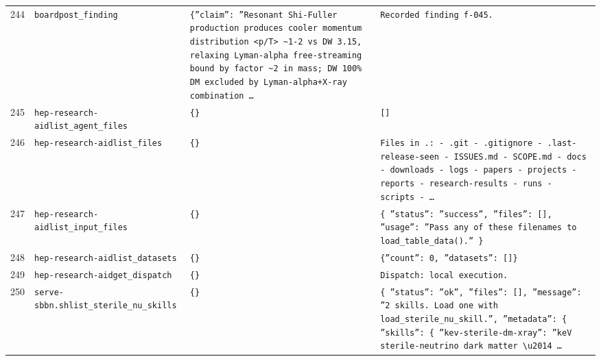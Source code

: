\documentclass[11pt,a4paper]{article}
\begin{document}
\begin{longtable}{@{}p{}p{}p{}p{}@{}}
244 & \texttt{board}\newline\texttt{post\_\allowbreak{}finding} & \texttt{\{''claim'':\allowbreak{} ''Resonant Shi-Fuller production produces cooler momentum distribution \textless{}\allowbreak{}p/\allowbreak{}T\textgreater{}\allowbreak{} \textasciitilde{}\allowbreak{}1-2 vs DW 3.15,\allowbreak{} relaxing Lyman-alpha free-streaming bound by factor \textasciitilde{}\allowbreak{}2 in mass;\allowbreak{} DW 100\% DM excluded by Lyman-alpha+X-ray combination \ldots{}\allowbreak{}} & \texttt{Recorded finding f-045.} \\
245 & \texttt{hep-research-aid}\newline\texttt{list\_\allowbreak{}agent\_\allowbreak{}files} & \texttt{\{\}\allowbreak{}} & \texttt{[]\allowbreak{}} \\
246 & \texttt{hep-research-aid}\newline\texttt{list\_\allowbreak{}files} & \texttt{\{\}\allowbreak{}} & \texttt{Files in .:\allowbreak{}   - .git   - .gitignore   - .last-release-seen   - ISSUES.md   - SCOPE.md   - docs   - downloads   - logs   - papers   - projects   - reports   - research-results   - runs   - scripts   - \ldots{}\allowbreak{}} \\
247 & \texttt{hep-research-aid}\newline\texttt{list\_\allowbreak{}input\_\allowbreak{}files} & \texttt{\{\}\allowbreak{}} & \texttt{\{   ''status'':\allowbreak{} ''success'',\allowbreak{}   ''files'':\allowbreak{} []\allowbreak{},\allowbreak{}   ''usage'':\allowbreak{} ''Pass any of these filenames to load\_\allowbreak{}table\_\allowbreak{}data()\allowbreak{}.'' \}\allowbreak{}} \\
248 & \texttt{hep-research-aid}\newline\texttt{list\_\allowbreak{}datasets} & \texttt{\{\}\allowbreak{}} & \texttt{\{''count'':\allowbreak{} 0,\allowbreak{} ''datasets'':\allowbreak{} []\allowbreak{}\}\allowbreak{}} \\
249 & \texttt{hep-research-aid}\newline\texttt{get\_\allowbreak{}dispatch} & \texttt{\{\}\allowbreak{}} & \texttt{Dispatch:\allowbreak{} local execution.} \\
250 & \texttt{serve-sbbn.sh}\newline\texttt{list\_\allowbreak{}sterile\_\allowbreak{}nu\_\allowbreak{}skills} & \texttt{\{\}\allowbreak{}} & \texttt{\{   ''status'':\allowbreak{} ''ok'',\allowbreak{}   ''files'':\allowbreak{} []\allowbreak{},\allowbreak{}   ''message'':\allowbreak{} ''2 skills. Load one with load\_\allowbreak{}sterile\_\allowbreak{}nu\_\allowbreak{}skill.'',\allowbreak{}   ''metadata'':\allowbreak{} \{     ''skills'':\allowbreak{} \{       ''kev-sterile-dm-xray'':\allowbreak{} ''keV sterile-neutrino dark matter \textbackslash{}\allowbreak{}u2014 \ldots{}\allowbreak{}} \\

\end{longtable}
\end{document}

